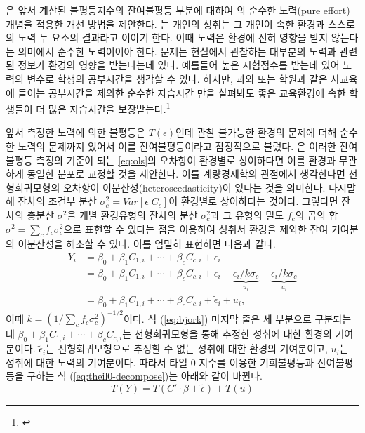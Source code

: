 \cite{betl12}은 앞서 계산된 불평등지수의 잔여불평등 부분에 대하여 \citeauthor{Roemer98}의 순수한 노력(pure effort) 개념을 적용한 개선 방법을 제안한다.
 \cite{Roemer98}는 개인의 성취는 그 개인이 속한 환경과 스스로의 노력 두 요소의 결과라고 이야기 한다.
이때 노력은 환경에 전혀 영향을 받지 않는다는 의미에서 순수한 노력이어야 한다.
문제는 현실에서 관찰하는 대부분의 노력과 관련된 정보가 환경의 영향을 받는다는데 있다.
예를들어 높은 시험점수를 받는데 있어 노력의 변수로 학생의 공부시간을 생각할 수 있다.
하지만, 과외 또는 학원과 같은 사교육에 들이는 공부시간을 제외한 순수한 자습시간 만을 살펴봐도 좋은 교육환경에 속한 학생들이 더 많은 자습시간을 보장받는다.\footnote{\cite{ohetl16}}

앞서 측정한 노력에 의한 불평등은 $T(\epsilon)$인데 관찰 불가능한 환경의 문제에 더해 순수한 노력의 문제까지 있어서 이를 잔여불평등이라고 잠정적으로 불렀다.
\cite{betl12}은 이러한 잔여불평등 측정의 기준이 되는 \ref{eq:ols}의 오차항이 환경별로 상이하다면 이를 환경과 무관하게 동일한 분포로 교정할 것을 제안한다.
이를 계량경제학의 관점에서 생각한다면 선형회귀모형의 오차항이 이분산성(heteroscedasticity)이 있다는 것을 의미한다.
다시말해 잔차의 조건부 분산 $\sigma ^2 _c = Var[\epsilon |C_c]$이 환경별로 상이하다는 것이다.
그렇다면 잔차의 총분산 $\sigma ^2$을 개별 환경유형의 잔차의 분산 $\sigma _c^2$과 그 유형의 밀도 $f_c$의 곱의 합 $\sigma ^2 =  \sum _c f_c \sigma ^2 _c$으로 표현할 수 있다는 점을 이용하여 성취서 환경을 제외한 잔여 기여분의 이분산성을 해소할 수 있다.
이를 엄밀히 표현하면 다음과 같다.
\begin{equation}
\label{eq:bjork}
 \begin{aligned} Y_{i} &= \beta _0 +  \beta _1 C_{1,i} + \cdots + \beta _c C_{c,i} + \epsilon_{i} \\ &= \beta _0 +  \beta _1 C_{1,i} + \cdots + \beta _c C_{c,i} +\epsilon_{i}-\underbrace{\epsilon_{i} / k \sigma_{c}}_{u_{i}}+\underbrace{\epsilon_{i} / k \sigma_{c}}_{u_{i}} \\ &= \beta _0 +  \beta _1 C_{1,i} + \cdots + \beta _c C_{c,i} +\widetilde{\epsilon}_{i}+u_{i}, \end{aligned}
\end{equation}
이때 $k = ( 1 / \sum _c f _c \sigma ^2 _c ) ^{-1/2}$이다.
식 (\ref{eq:bjork}) 마지막 줄은 세 부분으로 구분되는데 $\beta _0 +  \beta _1 C_{1,i} + \cdots + \beta _c C_{c,i}$는 선형회귀모형을 통해 추정한 성취에 대한 환경의 기여분이다. $\widetilde{\epsilon}_{i}$는 선형회귀모형으로 추정할 수 없는 성취에 대한 환경의 기여분이고, $u_i$는 성취에 대한 노력의 기여분이다.
따라서 타일-0 지수를 이용한 기회불평등과 잔여불평등을 구하는 식 (\ref{eq:theil0-decompose})는 아래와 같이 바뀐다.
\begin{equation}
 \label{eq:theil0-bjork}
 T(Y)=T(C' \cdot \beta +\widetilde{\epsilon}) + T ( u )
\end{equation}


